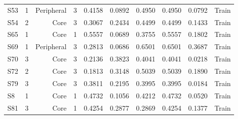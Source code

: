 {\begin{longtable}{lrrrrrrrrr}
  S53 & 1 & Peripheral & 3 & 0.4158 & 0.0892 & 0.4950 & 0.4950 & 0.0792 & Train \\
  S54 & 2 & Core & 3 & 0.3067 & 0.2434 & 0.4499 & 0.4499 & 0.1433 & Train \\
  S65 & 1 & Core & 1 & 0.5557 & 0.0689 & 0.3755 & 0.5557 & 0.1802 & Train \\
  S69 & 1 & Peripheral & 3 & 0.2813 & 0.0686 & 0.6501 & 0.6501 & 0.3687 & Train \\
  S70 & 3 & Core & 3 & 0.2136 & 0.3823 & 0.4041 & 0.4041 & 0.0218 & Train \\
  S72 & 2 & Core & 3 & 0.1813 & 0.3148 & 0.5039 & 0.5039 & 0.1890 & Train \\
  S79 & 3 & Core & 3 & 0.3811 & 0.2195 & 0.3995 & 0.3995 & 0.0184 & Train \\
  S8 & 1 & Core & 1 & 0.4732 & 0.1056 & 0.4212 & 0.4732 & 0.0520 & Train \\
  S81 & 3 & Core & 1 & 0.4254 & 0.2877 & 0.2869 & 0.4254 & 0.1377 & Train \\
\end{longtable}
}
